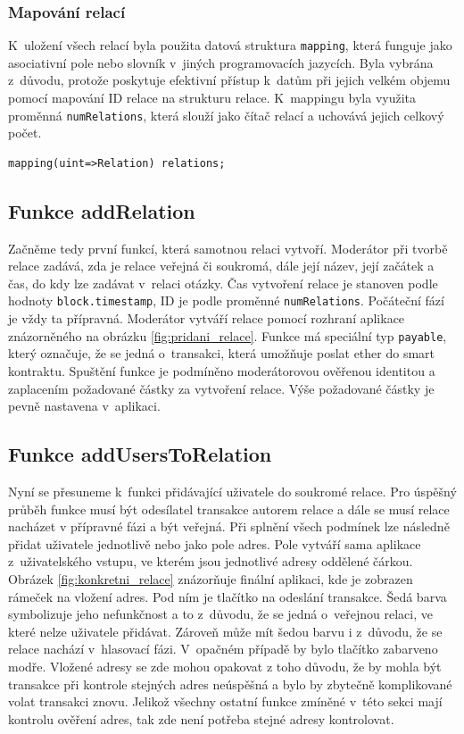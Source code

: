 \subsubsection*{Mapování relací}
K~uložení všech relací byla použita datová struktura \texttt{mapping}, která funguje jako asociativní pole nebo slovník v~jiných programovacích jazycích. Byla vybrána z~důvodu, protože poskytuje efektivní přístup k~datům při jejich velkém objemu pomocí mapování ID relace na strukturu relace. K~mappingu byla využita proměnná \texttt{numRelations}, která slouží jako čítač relací a uchovává jejich celkový počet.  

\begin{verbatim}
mapping(uint=>Relation) relations;   
\end{verbatim}

\subsection*{Funkce addRelation}
Začněme tedy první funkcí, která samotnou relaci vytvoří. Moderátor při tvorbě relace zadává, zda je relace veřejná či soukromá, dále její název, její začátek a čas, do kdy lze zadávat v~relaci otázky. Čas vytvoření relace je stanoven podle hodnoty \texttt{block.timestamp}, ID je podle proměnné \texttt{numRelations}. Počáteční fází je vždy ta přípravná. Moderátor vytváří relace pomocí rozhraní aplikace znázorněného na obrázku \ref{fig:pridani_relace}. Funkce má speciální typ \texttt{payable}, který označuje, že se jedná o~transakci, která umožňuje poslat ether do smart kontraktu. Spuštění funkce je podmíněno moderátorovou ověřenou identitou a zaplacením požadované částky za vytvoření relace. Výše požadované částky je pevně nastavena v~aplikaci. 

\subsection*{Funkce addUsersToRelation}
Nyní se přesuneme k~funkci přidávající uživatele do soukromé relace. Pro úspěšný průběh funkce musí být odesílatel transakce autorem relace a dále se musí relace nacházet v přípravné fázi a být veřejná. Při splnění všech podmínek lze následně přidat uživatele jednotlivě nebo jako pole adres. Pole vytváří sama aplikace z~uživatelského vstupu, ve kterém jsou jednotlivé adresy oddělené čárkou. Obrázek \ref{fig:konkretni_relace} znázorňuje finální aplikaci, kde je zobrazen rámeček na vložení adres. Pod ním je tlačítko na odeslání transakce. Šedá barva symbolizuje jeho nefunkčnost a to z~důvodu, že se jedná o~veřejnou relaci, ve které nelze uživatele přidávat. Zároveň může mít šedou barvu i z~důvodu, že se relace nachází v~hlasovací fázi. V~opačném případě by bylo tlačítko zabarveno modře. Vložené adresy se zde mohou opakovat z toho důvodu, že by mohla být transakce při kontrole stejných adres neúspěšná a bylo by zbytečně komplikované volat transakci znovu. Jelikož všechny ostatní funkce zmíněné v~této sekci mají kontrolu ověření adres, tak zde není potřeba stejné adresy kontrolovat.

